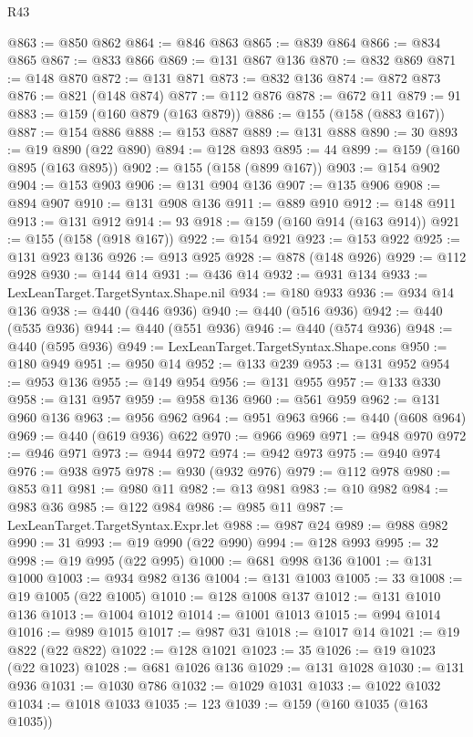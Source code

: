 \begin{lexlean}{R43}
\begin{coremodule}
@863 := @850 @862
@864 := @846 @863
@865 := @839 @864
@866 := @834 @865
@867 := @833 @866
@869 := @131 @867 @136
@870 := @832 @869
@871 := @148 @870
@872 := @131 @871
@873 := @832 @136
@874 := @872 @873
@876 := @821 (@148 @874)
@877 := @112 @876
@878 := @672 @11
@879 := 91
@883 := @159 (@160 @879 (@163 @879))
@886 := @155 (@158 (@883 @167))
@887 := @154 @886
@888 := @153 @887
@889 := @131 @888
@890 := 30
@893 := @19 @890 (@22 @890)
@894 := @128 @893
@895 := 44
@899 := @159 (@160 @895 (@163 @895))
@902 := @155 (@158 (@899 @167))
@903 := @154 @902
@904 := @153 @903
@906 := @131 @904 @136
@907 := @135 @906
@908 := @894 @907
@910 := @131 @908 @136
@911 := @889 @910
@912 := @148 @911
@913 := @131 @912
@914 := 93
@918 := @159 (@160 @914 (@163 @914))
@921 := @155 (@158 (@918 @167))
@922 := @154 @921
@923 := @153 @922
@925 := @131 @923 @136
@926 := @913 @925
@928 := @878 (@148 @926)
@929 := @112 @928
@930 := @144 @14
@931 := @436 @14
@932 := @931 @134
@933 := LexLeanTarget.TargetSyntax.Shape.nil
@934 := @180 @933
@936 := @934 @14 @136
@938 := @440 (@446 @936)
@940 := @440 (@516 @936)
@942 := @440 (@535 @936)
@944 := @440 (@551 @936)
@946 := @440 (@574 @936)
@948 := @440 (@595 @936)
@949 := LexLeanTarget.TargetSyntax.Shape.cons
@950 := @180 @949
@951 := @950 @14
@952 := @133 @239
@953 := @131 @952
@954 := @953 @136
@955 := @149 @954
@956 := @131 @955
@957 := @133 @330
@958 := @131 @957
@959 := @958 @136
@960 := @561 @959
@962 := @131 @960 @136
@963 := @956 @962
@964 := @951 @963
@966 := @440 (@608 @964)
@969 := @440 (@619 @936) @622
@970 := @966 @969
@971 := @948 @970
@972 := @946 @971
@973 := @944 @972
@974 := @942 @973
@975 := @940 @974
@976 := @938 @975
@978 := @930 (@932 @976)
@979 := @112 @978
@980 := @853 @11
@981 := @980 @11
@982 := @13 @981
@983 := @10 @982
@984 := @983 @36
@985 := @122 @984
@986 := @985 @11
@987 := LexLeanTarget.TargetSyntax.Expr.let
@988 := @987 @24
@989 := @988 @982
@990 := 31
@993 := @19 @990 (@22 @990)
@994 := @128 @993
@995 := 32
@998 := @19 @995 (@22 @995)
@1000 := @681 @998 @136
@1001 := @131 @1000
@1003 := @934 @982 @136
@1004 := @131 @1003
@1005 := 33
@1008 := @19 @1005 (@22 @1005)
@1010 := @128 @1008 @137
@1012 := @131 @1010 @136
@1013 := @1004 @1012
@1014 := @1001 @1013
@1015 := @994 @1014
@1016 := @989 @1015
@1017 := @987 @31
@1018 := @1017 @14
@1021 := @19 @822 (@22 @822)
@1022 := @128 @1021
@1023 := 35
@1026 := @19 @1023 (@22 @1023)
@1028 := @681 @1026 @136
@1029 := @131 @1028
@1030 := @131 @936
@1031 := @1030 @786
@1032 := @1029 @1031
@1033 := @1022 @1032
@1034 := @1018 @1033
@1035 := 123
@1039 := @159 (@160 @1035 (@163 @1035))

\end{coremodule}
\end{lexlean}
